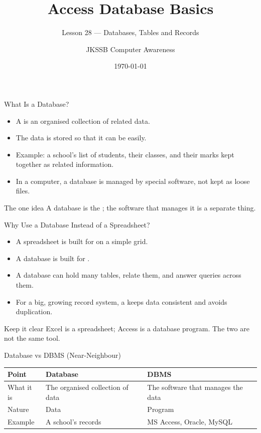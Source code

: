\documentclass[aspectratio=169]{beamer}
\title{Access Database Basics}
\subtitle{Lesson 28 --- Databases, Tables and Records}
\author{JKSSB Computer Awareness}
\date{\today}
\begin{document}
\frame{\titlepage}

\begin{frame}{What Is a Database?}
  \begin{itemize}
    \item A  is an organised collection of related data.
    \item The data is stored so that it can be  easily.
    \item Example: a school's list of students, their classes, and their
      marks kept together as related information.
    \item In a computer, a database is managed by special software, not kept
      as loose files.
  \end{itemize}
  \begin{block}{The one idea}
    A database is the ; the software that manages it
    is a separate thing.
  \end{block}
\end{frame}

\begin{frame}{Why Use a Database Instead of a Spreadsheet?}
  \begin{itemize}
    \item A spreadsheet is built for  on a simple grid.
    \item A database is built for .
    \item A database can hold many tables, relate them, and answer queries
      across them.
    \item For a big, growing record system, a  keeps data
      consistent and avoids duplication.
  \end{itemize}
  \begin{alertblock}{Keep it clear}
    Excel is a spreadsheet; Access is a database program. The two are not
    the same tool.
  \end{alertblock}
\end{frame}

\begin{frame}{Database vs DBMS (Near-Neighbour)}
  \begin{center}
    \begin{tabular}{p{}p{}p{}}
      \toprule
      \textbf{Point} & \textbf{Database} & \textbf{DBMS} \\
      \midrule
      What it is & The organised collection of data & The software that manages
        the data \\
      Nature & Data & Program \\
      Example & A school's records & MS Access, Oracle, MySQL \\
      \bottomrule
    \end{tabular}
  \end{center}
  \vspace{0.25cm}
\end{frame}
\end{document}
